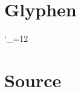 \documentclass{fontdoku}
\begin{document}
%
%
%
%
%
%
%
%
%


\newpage
\section{Glyphen}

\setlength{\columnseprule}{.5pt}
\setlength{\columnsep}{1cm}
\begin{multicols}{3}
   \newcommand{\GYLPHNAME}[1]{#1\hfill{\Huge\libertineGlyph{#1}\strut}\newline}
   \catcode`\_=12%
\end{multicols}



\newpage
\section{Source}


\end{document}
